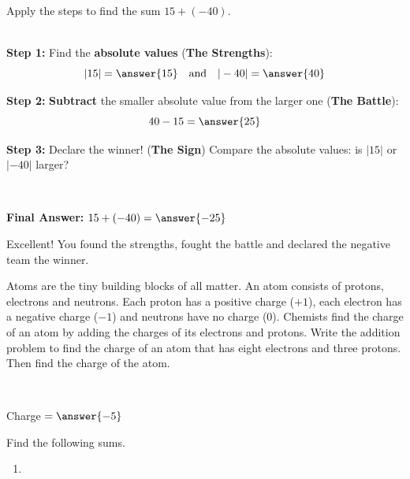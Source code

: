 \documentclass{ximera}[font=12pt]
\begin{document}
\bigskip

\begin{problem}
    Apply the steps to find the sum $15 + (-40).$

    ~ \\[3em]

    \textbf{Step 1:} Find the \textbf{absolute values} (\textbf{The Strengths}):
    \[ |15| = \answer{15} \quad \text{and} \quad |-40| = \answer{40} \]

    \begin{problem}
    \textbf{Step 2:} \textbf{Subtract} the smaller absolute value from the larger one (\textbf{The Battle}):
    \[ 40 - 15 = \answer{25} \]


\begin{problem}
    \textbf{Step 3:} Declare the winner! (\textbf{The Sign})
    Compare the absolute values: is $|15|$ or $|-40|$ larger?
    
     ~ \\
    \begin{multipleChoice}
    \end{multipleChoice}


\begin{problem}
    \textbf{Final Answer:} $15 + (-40) = \answer{-25}$

    \begin{feedback}[correct]
        Excellent! You found the strengths, fought the battle and declared the negative team the winner.
    \end{feedback}

\end{problem}
\end{problem}
\end{problem}
\end{problem}


\begin{problem}
Atoms are the tiny building blocks of all matter.  An atom consists of protons, electrons and neutrons.    
Each proton has a positive charge ($+1$), each electron has a negative charge ($-1$) and neutrons have no charge (0).  
Chemists find the charge of an atom by adding the charges of its electrons and protons.  Write the addition 
problem to find the charge of an atom that has eight electrons and three protons.  Then find the charge of the atom.

~ \\[2em] 

\begin{multipleChoice}
\end{multipleChoice}

Charge $= \answer{-5}$
\end{problem}


\begin{problem}
Find the following sums.

\begin{enumerate}
\item
\end{enumerate}

\end{problem}
\end{document}
